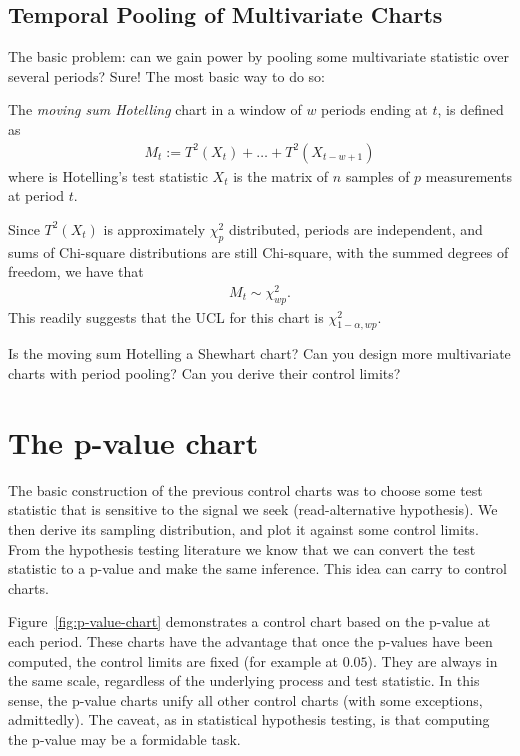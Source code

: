 \subsection{Temporal Pooling of Multivariate Charts}
The basic problem: can we gain power by pooling some multivariate statistic over several periods?
Sure!
The most basic way to do so:
\begin{definition}
The \emph{moving sum Hotelling} chart in a window of $w$ periods ending at $t$, is defined as
\begin{align}
	M_t:= T^2(X_t)+\dots+T^2(X_{t-w+1})
\end{align}
where \tsq is Hotelling's test statistic $X_t$ is the matrix of $n$ samples of $p$ measurements at period $t$. 
\end{definition}

Since $T^2(X_t)$ is approximately $\chi^2_p$ distributed, periods are independent, and sums of Chi-square distributions are still Chi-square, with the summed degrees of freedom, we have that 
\begin{align}
	M_t \sim \chi^2_{wp}.
\end{align}
This readily suggests that the UCL for this chart is $\chi^2_{1-\alpha,wp}$. 

\begin{think}
Is the moving sum Hotelling a Shewhart chart? 
Can you design more multivariate charts with period pooling? 
Can you derive their control limits?
\end{think}





\section{The p-value chart}
The basic construction of the previous control charts was to choose some test statistic that is sensitive to the signal  we seek (read-alternative hypothesis). We then derive its sampling distribution, and plot it against some control limits. 
From the hypothesis testing literature we know that we can convert the test statistic to a p-value and make the same inference. 
This idea can carry to control charts.

Figure~\ref{fig:p-value-chart} demonstrates a control chart based on the p-value at each period.
These charts have the advantage that once the p-values have been computed, the control limits are fixed (for example at $0.05$).
They are always in the same scale, regardless of the underlying process and test statistic. 
In this sense, the p-value charts unify all other control charts (with some exceptions, admittedly). 
The caveat, as in statistical hypothesis testing, is that computing the p-value may be a formidable task. 

